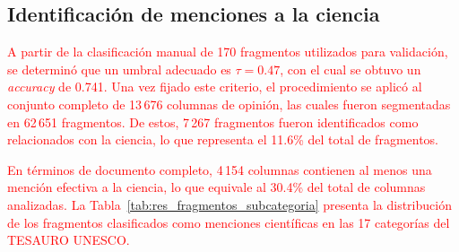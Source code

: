 \documentclass[11pt,a4paper]{article}
\begin{document}
	
	\subsection{Identificación de menciones a la ciencia}\label{sec:ident_menciones}
	
%	
	

\textcolor{red}{A partir de la clasificación manual de 170 fragmentos utilizados para validación, se determinó que un umbral adecuado es $\tau = 0.47$, con el cual se obtuvo un \emph{accuracy} de 0.741. Una vez fijado este criterio, el procedimiento se aplicó al conjunto completo de 13\,676 columnas de opinión, las cuales fueron segmentadas en 62\,651 fragmentos. De estos, 7\,267 fragmentos fueron identificados como relacionados con la ciencia, lo que representa el 11.6\% del total de fragmentos.}

\textcolor{red}{En términos de documento completo, 4\,154 columnas contienen al menos una mención efectiva a la ciencia, lo que equivale al 30.4\% del total de columnas analizadas. La Tabla~\ref{tab:res_fragmentos_subcategoria} presenta la distribución de los fragmentos clasificados como menciones científicas en las 17 categorías del TESAURO UNESCO.}
	
\end{document}
